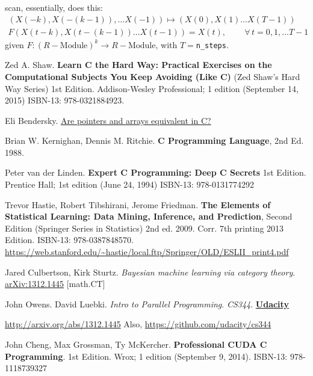 \documentclass[10pt]{amsart}
\begin{document}
\begin{multicols*}{2}
scan, essentially, does this:
\begin{equation}
\begin{gathered}
  (X(-k),X(-(k-1)),\dots X(-1)) \mapsto (X(0),X(1)\dots X(T-1)) \\ 
F(X(t-k), X(t-(k-1))\dots X(t-1)) = X(t), \qquad \, \forall \, t=0,1,\dots T-1
  \end{gathered}
\end{equation}
given $F:(R-\text{Module})^k \to R-\text{Module}$, with $T=$\verb|n_steps|.  




\end{multicols*}
\begin{thebibliography}{9}

Zed A. Shaw.  \textbf{Learn C the Hard Way: Practical Exercises on the Computational Subjects You Keep Avoiding (Like C)} (Zed Shaw's Hard Way Series) 1st Edition.  Addison-Wesley Professional; 1 edition (September 14, 2015) ISBN-13: 978-0321884923.  

Eli Bendersky.   \href{https://eli.thegreenplace.net/2009/10/21/are-pointers-and-arrays-equivalent-in-c}{Are pointers and arrays equivalent in C?}

Brian W. Kernighan, Dennis M. Ritchie.  \textbf{C Programming Language}, 2nd Ed. 1988.   

Peter van der Linden.  \textbf{Expert C Programming: Deep C Secrets} 1st Edition.  Prentice Hall; 1st edition (June 24, 1994)  ISBN-13: 978-0131774292

Trevor Hastie, Robert Tibshirani, Jerome Friedman.   \textbf{The Elements of Statistical Learning: Data Mining, Inference, and Prediction}, Second Edition (Springer Series in Statistics) 2nd ed. 2009. Corr. 7th printing 2013 Edition.  ISBN-13: 978-0387848570.  \url{https://web.stanford.edu/~hastie/local.ftp/Springer/OLD/ESLII_print4.pdf}

Jared Culbertson, Kirk Sturtz.  \emph{Bayesian machine learning via category theory}.  \href{http://arxiv.org/abs/1312.1445}{arXiv:1312.1445} [math.CT]

John Owens.  David Luebki.  \emph{Intro to Parallel Programming}.  \emph{CS344}.  \textbf{\href{https://www.udacity.com/}{Udacity}}  
  
\url{http://arxiv.org/abs/1312.1445} Also, \url{https://github.com/udacity/cs344}  

John Cheng, Max Grossman, Ty McKercher.  \textbf{Professional CUDA C Programming}.  1st Edition.  Wrox; 1 edition (September 9, 2014).  ISBN-13: 978-1118739327




\end{thebibliography}
\end{document}

